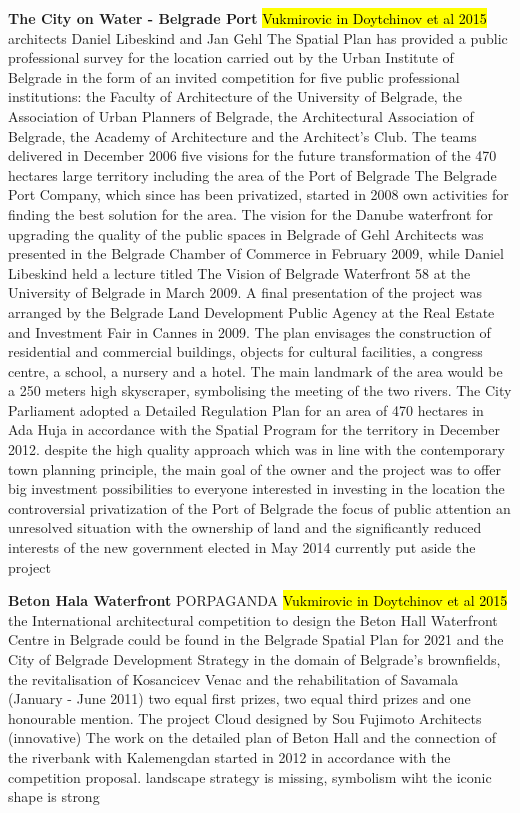 \documentclass[11pt]{report}
\begin{document}
\textbf{The City on Water - Belgrade Port}
		\hl{Vukmirovic in Doytchinov et al 2015}
architects Daniel Libeskind and Jan Gehl
The Spatial Plan has provided a public professional survey for the location carried out by the Urban Institute of Belgrade in the form of an invited competition for five public professional institutions:  the  Faculty  of  Architecture  of  the  University  of  Belgrade,  the Association  of  Urban  Planners  of  Belgrade,  the  Architectural  Association  of Belgrade,  the  Academy  of  Architecture  and  the  Architect’s  Club.  The  teams 
delivered in December 2006 five visions for the future transformation of the 
470 hectares large territory including the area of the Port of Belgrade
The  Belgrade  Port  Company,  which  since  has  been  privatized,  started  in 2008 own activities for finding the best solution for the area.
The  vision  for  the  Danube  waterfront for upgrading the quality of the public spaces in Belgrade of Gehl Architects was presented in the Belgrade Chamber of Commerce in February 2009, while Daniel Libeskind held a lecture titled The Vision of Belgrade Waterfront 58  at the University of Belgrade in March 2009.
A final presentation of the project was arranged by the Belgrade Land Development Public Agency at the Real Estate and Investment Fair in Cannes in 2009.
The  plan  envisages  the  construction of  residential  and  commercial  buildings,  objects for cultural facilities, a congress centre, a school, a 
nursery and a hotel. The main landmark of the area would be a 250 meters high skyscraper, symbolising the meeting of the two rivers. 
The  City  Parliament  adopted  a  Detailed  Regulation Plan  for  an  area  of  470  hectares  in  Ada  Huja  in accordance with the Spatial Program for the territory in  December  2012.
despite the  high  quality  approach  which  was  in  line  with  the contemporary town planning principle, the main goal of the owner and the project was to  offer big investment possibilities to everyone interested in investing in the location
the controversial privatization of the Port of Belgrade the focus of public attention
an unresolved situation with the ownership of land and the significantly reduced interests of the new government elected in May 2014 currently put aside the project

\textbf{Beton Hala Waterfront}
PORPAGANDA
			\hl{Vukmirovic in Doytchinov et al 2015}
the  International  architectural  competition  to  design 
the Beton Hall Waterfront Centre in Belgrade could be found in the Belgrade 
Spatial Plan for 2021 and the City of Belgrade Development Strategy in the 
domain of Belgrade’s brownfields, the revitalisation of Kosancicev Venac and 
the rehabilitation of Savamala  (January - June 2011)
 two equal first prizes, two equal third prizes and one honourable mention.
The project  Cloud  designed  by  Sou  Fujimoto  Architects (innovative)
The work on the detailed plan of Beton Hall and the connection of the riverbank 
with  Kalemengdan  started  in  2012  in  accordance  with  the  competition 
proposal.
landscape strategy is missing, symbolism wiht the iconic shape is strong
\end{document}
